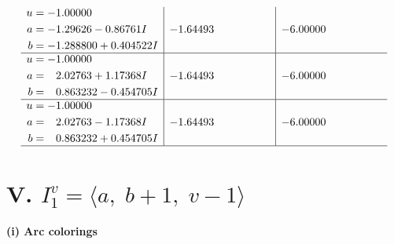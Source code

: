 \documentclass[1p]{elsarticle_modified}
\theoremstyle{definition}
\begin{document}
$$\begin{array}{c|c|c}
\begin{aligned}
u &= -1.00000\phantom{ +0.000000I} \\
a &= -1.29626 - 0.86761 I \\
b &= -1.288800 + 0.404522 I\end{aligned}
 & -1.64493\phantom{ +0.000000I} & -6.00000\phantom{ +0.000000I} \\ \hline\begin{aligned}
u &= -1.00000\phantom{ +0.000000I} \\
a &= \phantom{-}2.02763 + 1.17368 I \\
b &= \phantom{-}0.863232 - 0.454705 I\end{aligned}
 & -1.64493\phantom{ +0.000000I} & -6.00000\phantom{ +0.000000I} \\ \hline\begin{aligned}
u &= -1.00000\phantom{ +0.000000I} \\
a &= \phantom{-}2.02763 - 1.17368 I \\
b &= \phantom{-}0.863232 + 0.454705 I\end{aligned}
 & -1.64493\phantom{ +0.000000I} & -6.00000\phantom{ +0.000000I}\\
 \hline 
 \end{array}$$\newpage\newpage\renewcommand{\arraystretch}{1}
\centering \section*{V. $I^v_{1}= \langle a,\;b+1,\;v-1 \rangle$}
\flushleft \textbf{(i) Arc colorings}\\
\end{document}
